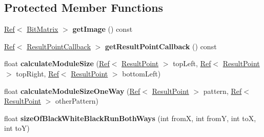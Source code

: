 \subsection*{Protected Member Functions}
\begin{DoxyCompactItemize}
\item 
\mbox{\label{classzxing_1_1qrcode_1_1_detector_a3d68b675e14759c2f45d65c2cfe1a8dc}} 
\mbox{\hyperlink{classzxing_1_1_ref}{Ref}}$<$ \mbox{\hyperlink{classzxing_1_1_bit_matrix}{Bit\+Matrix}} $>$ {\bfseries get\+Image} () const
\item 
\mbox{\label{classzxing_1_1qrcode_1_1_detector_a9b3e6842c50154ec7d937c53e25a492f}} 
\mbox{\hyperlink{classzxing_1_1_ref}{Ref}}$<$ \mbox{\hyperlink{classzxing_1_1_result_point_callback}{Result\+Point\+Callback}} $>$ {\bfseries get\+Result\+Point\+Callback} () const
\item 
\mbox{\label{classzxing_1_1qrcode_1_1_detector_a1b3011fa4e99db83466cd39c7f8e977b}} 
float {\bfseries calculate\+Module\+Size} (\mbox{\hyperlink{classzxing_1_1_ref}{Ref}}$<$ \mbox{\hyperlink{classzxing_1_1_result_point}{Result\+Point}} $>$ top\+Left, \mbox{\hyperlink{classzxing_1_1_ref}{Ref}}$<$ \mbox{\hyperlink{classzxing_1_1_result_point}{Result\+Point}} $>$ top\+Right, \mbox{\hyperlink{classzxing_1_1_ref}{Ref}}$<$ \mbox{\hyperlink{classzxing_1_1_result_point}{Result\+Point}} $>$ bottom\+Left)
\item 
\mbox{\label{classzxing_1_1qrcode_1_1_detector_a684baf233699de116224289d611aa408}} 
float {\bfseries calculate\+Module\+Size\+One\+Way} (\mbox{\hyperlink{classzxing_1_1_ref}{Ref}}$<$ \mbox{\hyperlink{classzxing_1_1_result_point}{Result\+Point}} $>$ pattern, \mbox{\hyperlink{classzxing_1_1_ref}{Ref}}$<$ \mbox{\hyperlink{classzxing_1_1_result_point}{Result\+Point}} $>$ other\+Pattern)
\item 
\mbox{\label{classzxing_1_1qrcode_1_1_detector_ab77100ad7ebe47267878b01d84f88d58}} 
float {\bfseries size\+Of\+Black\+White\+Black\+Run\+Both\+Ways} (int fromX, int fromY, int toX, int toY)
\item 
\mbox{\label{classzxing_1_1qrcode_1_1_detector_a6d2a7c74fa485b10e72c228a8c582714}} 

\end{DoxyCompactItemize}
